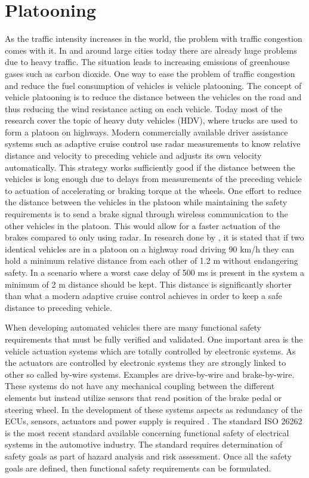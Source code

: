 \section{Platooning}
As the traffic intensity increases in the world, the problem with traffic congestion comes with it. In and around large cities today there are already huge problems due to heavy traffic. The situation leads to increasing emissions of greenhouse gases such as carbon dioxide. One way to ease the problem of traffic congestion and reduce the fuel consumption of vehicles is vehicle platooning. The concept of vehicle platooning is to reduce the distance between the vehicles on the road and thus reducing the wind resistance acting on each vehicle. Today most of the research cover the topic of heavy duty vehicles (HDV), where trucks are used to form a platoon on highways. Modern commercially available driver assistance systems such as adaptive cruise control use radar measurements to know relative distance and velocity to preceding vehicle and adjusts its own velocity automatically. This strategy works sufficiently good if the distance between the vehicles is long enough due to delays from measurements of the preceding vehicle to actuation of accelerating or braking torque at the wheels. One effort to reduce the distance between the vehicles in the platoon while maintaining the safety requirements is to send a brake signal through wireless communication to the other vehicles in the platoon. This would allow for a faster actuation of the brakes compared to only using radar. In research done by \cite{alam2014guaranteeing}, it is stated that if two identical vehicles are in a platoon on a highway road driving 90 km/h they can hold a minimum relative distance from each other of 1.2 m without endangering safety. In a scenario where a worst case delay of 500 ms is present in the system a minimum of 2 m distance should be kept. This distance is significantly shorter than what a modern adaptive cruise control achieves in order to keep a safe distance to preceding vehicle.


When developing automated vehicles there are many functional safety requirements that must be fully verified and validated. One important area is the vehicle actuation systems which are totally controlled by electronic systems. As the actuators are controlled by electronic systems they are strongly linked to other so called by-wire systems. Examples are drive-by-wire and brake-by-wire. These systems do not have any mechanical coupling between the different elements but instead utilize sensors that read position of the brake pedal or steering wheel. In the development of these systems aspects as redundancy of the ECUs, sensors, actuators and power supply is required \cite{stolte2016safety}. 	The standard ISO 26262 is the most recent standard available concerning functional safety of electrical systems in the automotive industry. The standard requires determination of safety goals as part of hazard analysis and risk assessment. Once all the safety goals are defined, then functional safety requirements can be formulated.

